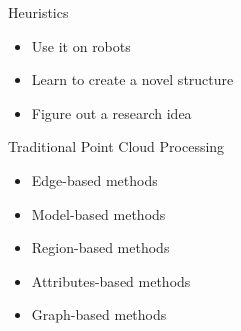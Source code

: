 \documentclass[serif,mathserif]{beamer}
\begin{document}
\begin{frame}{Heuristics}
	\begin{itemize}
		\item Use it on robots
		\item Learn to create a novel structure
		\item Figure out a research idea
	\end{itemize}
\end{frame}

\begin{frame}{Traditional Point Cloud Processing}
	\begin{itemize}
		\item Edge-based methods
		\item Model-based methods
		\item Region-based methods
		\item Attributes-based methods
		\item Graph-based methods
	\end{itemize}
	\begin{figure}
		\centering
		
	\end{figure}
	
\end{frame}
\end{document}
